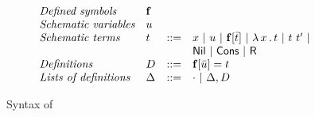 \documentclass{article}
\begin{document}
\begin{figure}
  \[
  \begin{array}{llll}
   \textit{Defined symbols} & \mathbf{f} & \ &\ \\
   \textit{Schematic variables} & u & \ &\ \\
    \textit{Schematic terms} & t & ::= & x\ |\ u\ |\ \mathbf{f}[\bar{t}]\ |\ \lam{x}{t}\ |\ t\ t'\ |\\
    \ &\ &\ & \mathsf{Nil}\ |\ \mathsf{Cons}\ |\ \mathsf{R} \\
    \textit{Definitions} & D & ::= & \mathbf{f}[\bar{u}] = t \\
    \textit{Lists of definitions} & \Delta & ::= & \cdot \ |\ \Delta, D
  \end{array}
  \]
  \caption{Syntax of \sar}
\label{fig:sarsyn}
\end{figure}
\end{document}
